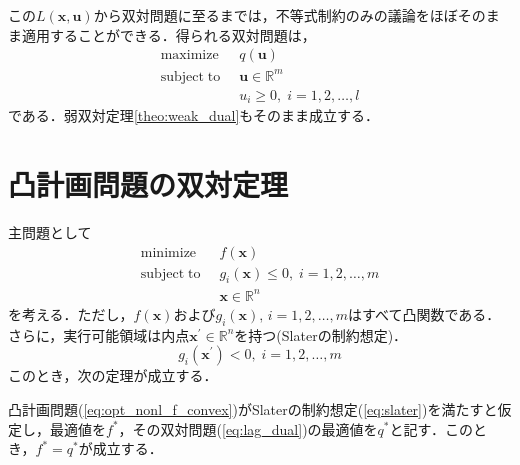 \documentclass{jsreport}
\begin{document}
この$L(\bm{x}, \bm{u})$から双対問題に至るまでは，不等式制約のみの議論をほぼそのまま適用することができる．得られる双対問題は，
\begin{align}\label{eq:dual_eq}
  \mathrm{maximize} \; \; &q(\bm{u}) \nonumber \\
  \mathrm{subject \; to} \; \; &\bm{u} \in \mathbb{R}^m \\
  &u_i \geq 0, \; i = 1, 2, \ldots, l \nonumber
\end{align}
である．弱双対定理\ref{theo:weak_dual}もそのまま成立する．

\section{凸計画問題の双対定理}
主問題として
\begin{align}\label{eq:opt_nonl_f_convex}
  \mathrm{minimize} \; \; &f(\bm{x}) \nonumber\\
  \mathrm{subject \; to} \; \; &g_i(\bm{x}) \leq 0, \; i = 1, 2, \ldots, m  \\
  &\bm{x} \in \mathbb{R}^n \nonumber
\end{align}
を考える．ただし，$f(\bm{x})$および$g_i(\bm{x}), \, i = 1, 2, \ldots, m$はすべて凸関数である．さらに，実行可能領域は内点$\bm{x}^{\prime} \in \mathbb{R}^n$を持つ(Slaterの制約想定)．
\begin{equation}\label{eq:slater}
  g_i(\bm{x}^{\prime}) < 0, \; i = 1, 2, \ldots, m
\end{equation}
このとき，次の定理が成立する．
\begin{theo}[凸計画問題の双対定理]\label{theo:dual_convex}
  凸計画問題(\ref{eq:opt_nonl_f_convex})がSlaterの制約想定(\ref{eq:slater})を満たすと仮定し，最適値を$f^{*}$，その双対問題(\ref{eq:lag_dual})の最適値を$q^{*}$と記す．このとき，$f^{*} = q^{*}$が成立する．
\end{theo}
\end{document}
